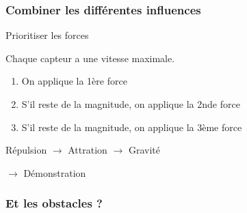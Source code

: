 \documentclass{beamer}
\begin{document}
\begin{frame}

  \frametitle{Combiner les différentes influences}

  \begin{block}{Prioritiser les forces}

    Chaque capteur a une vitesse maximale.

    \begin{enumerate}
      \item{On applique la 1ère force}
      \item{S'il reste de la magnitude, on applique la 2nde force}
      \item{S'il reste de la magnitude, on applique la 3ème force}
    \end{enumerate}

  \end{block}

  \vfill

  \begin{center}
    \alert{Répulsion $\rightarrow$ Attration $\rightarrow$ Gravité}
  \end{center}

  \vfill

  $\rightarrow$ Démonstration

\end{frame}

\begin{frame}

  \frametitle{Et les obstacles ?}



\end{frame}
\end{document}
